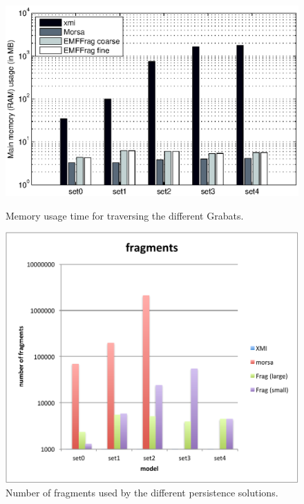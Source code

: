 \begin{figure}[ht]
\begin{minipage}[b]{0.48\linewidth}
\label{fig:grabatsQueryTime}
\end{minipage}
\begin{minipage}[b]{0.48\linewidth}
\centering
\vspace{0.04\linewidth}
\includegraphics[width=\linewidth]{figures/grabatsTraverseMem}
\caption{Memory usage time for traversing the different Grabats.}
\label{fig:grabatsTraverseMem}
\end{minipage}
\hspace{0.02\linewidth}
\begin{minipage}[b]{0.48\linewidth}
\centering
\includegraphics[width=\linewidth]{figures/grabatsFragments}
\caption{Number of fragments used by the different persistence solutions.}
\label{fig:grabatsFragments}
\end{minipage}
\end{figure}

